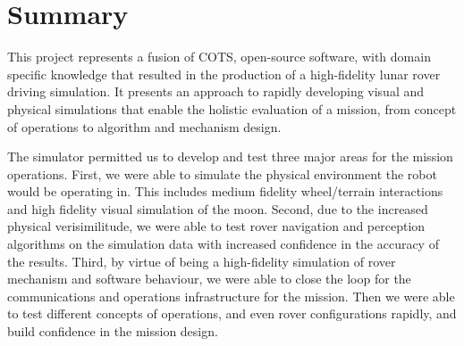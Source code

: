 \documentclass[twocolumn,letterpaper]{IEEEAerospaceCLS}  %
\begin{document}
\section{Summary}

This project represents a fusion of COTS, open-source software, with domain specific knowledge that resulted in the production of a high-fidelity lunar rover driving simulation. It presents an approach to rapidly developing visual and physical simulations that enable the holistic evaluation of a mission, from concept of operations to algorithm and mechanism design.

The simulator permitted us to develop and test three major areas for the mission operations.  First, we were able to simulate the physical environment the robot would be operating in.  This includes medium fidelity wheel/terrain interactions and high fidelity visual simulation of the moon.  Second, due to the increased physical verisimilitude, we were able to test rover navigation and perception algorithms on the simulation data with increased confidence in the accuracy of the results.  Third, by virtue of being a high-fidelity simulation of rover mechanism and software behaviour, we were able to close the loop for the communications and operations infrastructure for the mission.  Then we were able to test different concepts of operations, and even rover configurations rapidly, and build confidence in the mission design.




\end{document}
